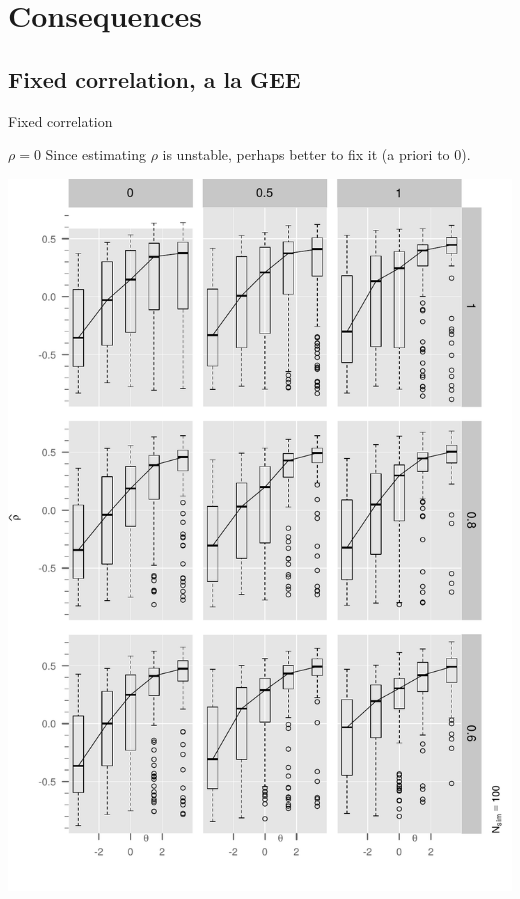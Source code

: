 \documentclass{beamer}
\begin{document}




\section{Consequences}

\subsection{Fixed correlation, a la GEE}

\begin{frame}{Fixed correlation }
\begin{block}{$\rho=0$}
Since estimating $\rho$ is unstable, perhaps better to fix it (a priori to 0). 
\end{block}

\end{frame}

\begin{frame}{}
    \includegraphics[width=1.00\textwidth]{Figure2/boxplotArray2.pdf} %
\end{frame}
\end{document}

